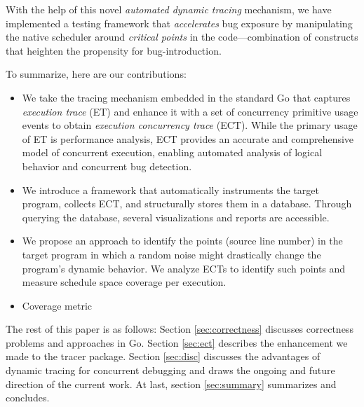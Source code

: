 With the help of this novel \textit{automated dynamic tracing} mechanism,
we have implemented a testing framework that
\textit{accelerates} bug exposure by manipulating the native scheduler around \textit{critical points} in the code---combination of constructs that heighten the propensity for bug-introduction.
%



To summarize, here are our contributions:
\begin{itemize}
    \item We take the tracing mechanism embedded in the standard Go that captures \textit{execution trace} (ET) and enhance it with a set of concurrency primitive usage events to obtain \textit{execution concurrency trace} (ECT). While the primary usage of ET is performance analysis, ECT provides an accurate and comprehensive model of concurrent execution, enabling automated analysis of logical behavior and concurrent bug detection.
    \item We introduce a framework that automatically instruments the target program, collects ECT, and structurally stores them in a database. Through querying the database, several visualizations and reports are accessible.
    \item We propose an approach to identify the points (\ie source line number) in the target program in which a random noise might drastically change the program's dynamic behavior. We analyze ECTs to identify such points and measure schedule space coverage per execution.
    \item Coverage metric
\end{itemize}
The rest of this paper is as follows: Section \ref{sec:correctness} discusses correctness problems and approaches in Go. Section \ref{sec:ect} describes the enhancement we made to the tracer package. Section \ref{sec:disc} discusses the advantages of dynamic tracing for concurrent debugging and draws the ongoing and future direction of the current work. At last, section \ref{sec:summary} summarizes and concludes.
